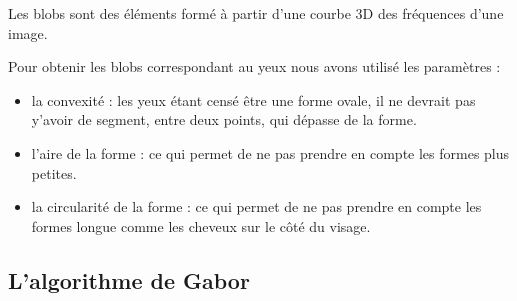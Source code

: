 Les blobs sont des éléments formé à partir d'une courbe 3D des fréquences d'une image.

Pour obtenir les blobs correspondant au yeux nous avons utilisé les paramètres :
\begin{itemize}
 \item la convexité : les yeux étant censé être une forme ovale, il ne devrait pas y'avoir de segment, entre 
 deux points, qui dépasse de la forme.
 \item l'aire de la forme : ce qui permet de ne pas prendre en compte les formes plus petites.
 \item la circularité de la forme : ce qui permet de ne pas prendre en compte les formes longue comme les cheveux
 sur le côté du visage.
\end{itemize}


\subsection{L'algorithme de Gabor}